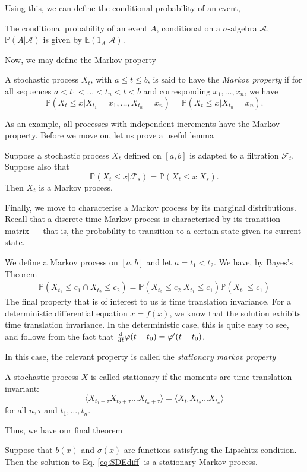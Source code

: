 \documentclass[prb,12pt]{revtex4-2}
\theoremstyle{definition}
\theoremstyle{definition}
\theoremstyle{definition}
\begin{document}
Using this, we can define the conditional probability of an event,
\begin{Definition}
	The conditional probability of an event $A$, conditional on a $\sigma$-algebra $\mathcal{A}$, $\mathbb{P}(A|\mathcal{A})$ is given by $\mathbb{E}(1_A|\mathcal{A})$.
\end{Definition}
Now, we may define the Markov property
\begin{Definition}
	A stochastic process $X_t$, with $a\le t \le b$, is said to have the \emph{Markov property} if for all sequences $a < t_1 < \dots < t_n < t < b$ and corresponding $x_1, \dots, x_n$, we have
	\[
	\mathbb{P}(X_t\le x|X_{t_1}=x_1, \dots, X_{t_n}=x_n) = \mathbb{P}(X_t\le x|X_{t_n}=x_n)
	.\] 
\end{Definition}
As an example, all processes with independent increments have the Markov property. 
Before we move on, let us prove a useful lemma
\begin{Lemma}
	Suppose a stochastic process $X_t$ defined on $[a,b]$ is adapted to a filtration $\mathcal{F}_t$. Suppose also that
	\[
	\mathbb{P}(X_t\le x|\mathcal{F}_s) = \mathbb{P}(X_t \le x|X_s)
	.\] 
	Then $X_t$ is a Markov process.
\end{Lemma}

Finally, we move to characterise a Markov process by its marginal distributions. Recall that a discrete-time Markov process is characterised by its transition matrix --- that is, the probability to transition to a certain state given its current state.

We define a Markov process on $[a,b]$ and let $a=t_1<t_2$. We have, by Bayes's Theorem
\begin{align*}
	\mathbb{P}(X_{t_1}\le c_1 \cap X_{t_2}\le c_2)=\mathbb{P}(X_{t_2}\le c_2 |X_{t_1}\le c_1)\mathbb{P}(X_{t_1}\le c_1)
\end{align*}
The final property that is of interest to us is time translation invariance. For a deterministic differential equation $\dot{x} = f(x)$, we know that the solution exhibits time translation invariance. In the deterministic case, this is quite easy to see, and follows from the fact that $\dv{t}\varphi(t - t_0) = \varphi'(t-t_0)$. 

In this case, the relevant property is called the \emph{stationary markov property}
\begin{Definition}
	A stochastic process $X$ is called stationary if the moments are time translation invariant:
	\[
	\langle X_{t_1+\tau}X_{t_2+\tau}\dots X_{t_n+\tau}\rangle = \langle X_{t_1}X_{t_2}\dots X_{t_n}\rangle
	\]
	for all $n,\tau$ and $t_1, \dots, t_n$.
\end{Definition}

Thus, we have our final theorem
\begin{Theorem}
	Suppose that $b(x)$ and $\sigma(x)$ are functions satisfying the Lipschitz condition. Then the solution to Eq. \eqref{eq:SDEdiff} is a stationary Markov process.
\end{Theorem}


\end{document}
